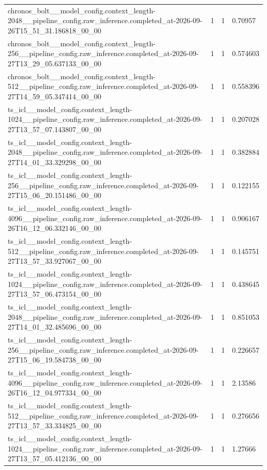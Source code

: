 \begin{tabular}{llll}
chronos\_bolt\_\_model\_config.context\_length-2048\_\_pipeline\_config.raw\_inference.completed\_at-2026-09-26T15\_51\_31.186818\_00\_00 & 1 & 1 & 0.70957 \\
chronos\_bolt\_\_model\_config.context\_length-256\_\_pipeline\_config.raw\_inference.completed\_at-2026-09-27T13\_29\_05.637133\_00\_00 & 1 & 1 & 0.574603 \\
chronos\_bolt\_\_model\_config.context\_length-512\_\_pipeline\_config.raw\_inference.completed\_at-2026-09-27T14\_59\_05.347414\_00\_00 & 1 & 1 & 0.558396 \\
ts\_icl\_\_model\_config.context\_length-1024\_\_pipeline\_config.raw\_inference.completed\_at-2026-09-27T13\_57\_07.143807\_00\_00 & 1 & 1 & 0.207028 \\
ts\_icl\_\_model\_config.context\_length-2048\_\_pipeline\_config.raw\_inference.completed\_at-2026-09-27T14\_01\_33.329298\_00\_00 & 1 & 1 & 0.382884 \\
ts\_icl\_\_model\_config.context\_length-256\_\_pipeline\_config.raw\_inference.completed\_at-2026-09-27T15\_06\_20.151486\_00\_00 & 1 & 1 & 0.122155 \\
ts\_icl\_\_model\_config.context\_length-4096\_\_pipeline\_config.raw\_inference.completed\_at-2026-09-26T16\_12\_06.332146\_00\_00 & 1 & 1 & 0.906167 \\
ts\_icl\_\_model\_config.context\_length-512\_\_pipeline\_config.raw\_inference.completed\_at-2026-09-27T13\_57\_33.927067\_00\_00 & 1 & 1 & 0.145751 \\
ts\_icl\_\_model\_config.context\_length-1024\_\_pipeline\_config.raw\_inference.completed\_at-2026-09-27T13\_57\_06.473154\_00\_00 & 1 & 1 & 0.438645 \\
ts\_icl\_\_model\_config.context\_length-2048\_\_pipeline\_config.raw\_inference.completed\_at-2026-09-27T14\_01\_32.485696\_00\_00 & 1 & 1 & 0.851053 \\
ts\_icl\_\_model\_config.context\_length-256\_\_pipeline\_config.raw\_inference.completed\_at-2026-09-27T15\_06\_19.584738\_00\_00 & 1 & 1 & 0.226657 \\
ts\_icl\_\_model\_config.context\_length-4096\_\_pipeline\_config.raw\_inference.completed\_at-2026-09-26T16\_12\_04.977334\_00\_00 & 1 & 1 & 2.13586 \\
ts\_icl\_\_model\_config.context\_length-512\_\_pipeline\_config.raw\_inference.completed\_at-2026-09-27T13\_57\_33.334825\_00\_00 & 1 & 1 & 0.276656 \\
ts\_icl\_\_model\_config.context\_length-1024\_\_pipeline\_config.raw\_inference.completed\_at-2026-09-27T13\_57\_05.412136\_00\_00 & 1 & 1 & 1.27666 \\

\end{tabular}

